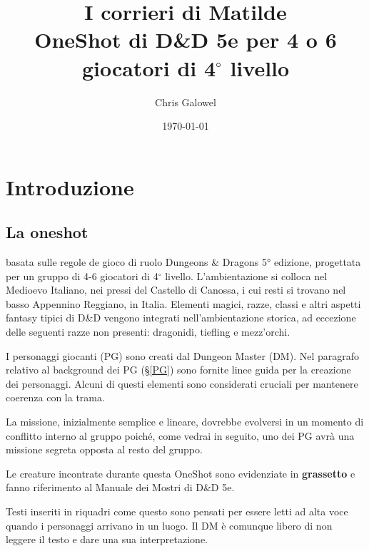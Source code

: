 \documentclass[letterpaper,twocolumn,openany,nodeprecatedcode]{dndbook}
\title{I corrieri di Matilde \\
\large OneShot di D\&D 5e per 4 o 6 giocatori di 4$^\circ$ livello}
\author{Chris Galowel}
\date{\today}
\begin{document}
\frontmatter

\maketitle

\tableofcontents


\mainmatter%





\chapter{Introduzione}


\section{La oneshot}
 basata sulle regole de gioco di ruolo Dungeons \& Dragons 5° edizione\cite{dnd:giocatore}, progettata per un gruppo di 4-6 giocatori di 4$^\circ$ livello. L'ambientazione si colloca nel Medioevo Italiano, nei pressi del Castello di Canossa, i cui resti si trovano nel basso Appennino Reggiano, in Italia. Elementi magici, razze, classi e altri aspetti fantasy tipici di D\&D vengono integrati nell'ambientazione storica, ad eccezione delle seguenti razze non presenti: dragonidi, tiefling e mezz'orchi.

I personaggi giocanti (PG) sono creati dal Dungeon Master (DM). Nel paragrafo relativo al background dei PG (§\ref{PG}) sono fornite linee guida per la creazione dei personaggi. Alcuni di questi elementi sono considerati cruciali per mantenere coerenza con la trama.

La missione, inizialmente semplice e lineare, dovrebbe evolversi in un momento di conflitto interno al gruppo poiché, come vedrai in seguito, uno dei PG avrà una missione segreta opposta al resto del gruppo.

Le creature incontrate durante questa OneShot sono evidenziate in \textbf{grassetto} e fanno riferimento al Manuale dei Mostri di D\&D 5e\cite{dnd:mostri}.

\begin{DndReadAloud}
Testi inseriti in riquadri come questo sono pensati per essere letti ad alta voce quando i personaggi arrivano in un luogo. Il DM è comunque libero di non leggere il testo e dare una sua interpretazione.
\end{DndReadAloud}
\end{document}
